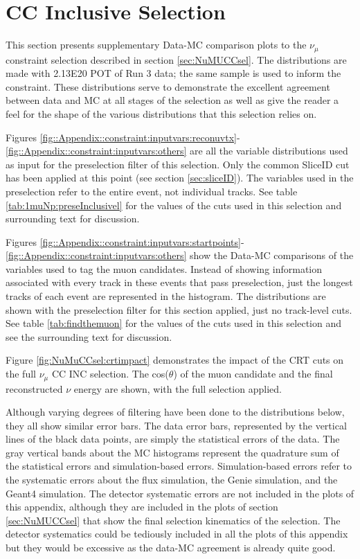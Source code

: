 \section{\numu CC Inclusive Selection }
\label{sec:Appendix:numu:constr}
\par This section presents supplementary Data-MC comparison plots to the $\nu_{\mu}$ constraint selection described in section \ref{sec:NuMUCCsel}. The distributions are made with 2.13E20 POT of Run 3 data; the same sample is used to inform the constraint. These distributions serve to demonstrate the excellent agreement between data and MC at all stages of the selection as well as give the reader a feel for the shape of the various distributions that this selection relies on. 

\par Figures \ref{fig::Appendix::constraint:inputvars:reconuvtx}-\ref{fig::Appendix::constraint:inputvars:others} are all the variable distributions used as input for the preselection filter of this selection. Only the common SliceID cut has been applied at this point (see section \ref{sec:sliceID}). The variables used in the preselection refer to the entire event, not individual tracks. See table \ref{tab:1muNp:preseInclusivel} for the values of the cuts used in this selection and surrounding text for discussion.

\par Figures \ref{fig::Appendix::constraint:inputvars:startpoints}-\ref{fig::Appendix::constraint:inputvars:others} show the Data-MC comparisons of the variables used to tag the muon candidates. Instead of showing information associated with every track in these events that pass preselection, just the longest tracks of each event are represented in the histogram. The distributions are shown with the preselection filter for this section applied, just no track-level cuts. See table \ref{tab:findthemuon} for the values of the cuts used in this selection and see the surrounding text for discussion.

\par Figure \ref{fig:NuMuCCsel:crtimpact} demonstrates the impact of the CRT cuts on the full $\nu_{\mu}$ CC INC selection. The cos($\theta$) of the muon candidate and the final reconstructed $\nu$ energy are shown, with the full selection applied. 

\par Although varying degrees of filtering have been done to the distributions below, they all show similar error bars. The data error bars, represented by the vertical lines of the black data points, are simply the statistical errors of the data. The gray vertical bands about the MC histograms represent the quadrature sum of the statistical errors and simulation-based errors. Simulation-based errors refer to the systematic errors about the flux simulation, the Genie simulation, and the Geant4 simulation. The detector systematic errors are not included in the plots of this appendix, although they are included in the plots of section \ref{sec:NuMUCCsel} that show the final selection kinematics of the selection. The detector systematics could be tediously included in all the plots of this appendix but they would be excessive as the data-MC agreement is already quite good. 


